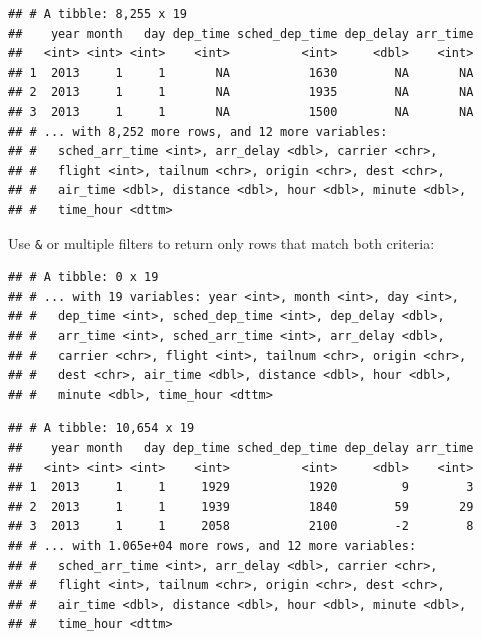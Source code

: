 \documentclass[]{book}
\newenvironment{Shaded}{}{}
\newcommand{\DecValTok}[1]{#1}
\newcommand{\KeywordTok}[1]{\textcolor[rgb]{0.00,0.00,1.00}{#1}}
\newcommand{\NormalTok}[1]{#1}
\newcommand{\OperatorTok}[1]{#1}
\newcommand{\StringTok}[1]{\textcolor[rgb]{0.00,0.50,0.50}{#1}}
\begin{document}
\begin{verbatim}
## # A tibble: 8,255 x 19
##    year month   day dep_time sched_dep_time dep_delay arr_time
##   <int> <int> <int>    <int>          <int>     <dbl>    <int>
## 1  2013     1     1       NA           1630        NA       NA
## 2  2013     1     1       NA           1935        NA       NA
## 3  2013     1     1       NA           1500        NA       NA
## # ... with 8,252 more rows, and 12 more variables:
## #   sched_arr_time <int>, arr_delay <dbl>, carrier <chr>,
## #   flight <int>, tailnum <chr>, origin <chr>, dest <chr>,
## #   air_time <dbl>, distance <dbl>, hour <dbl>, minute <dbl>,
## #   time_hour <dttm>
\end{verbatim}

Use \texttt{\&} or multiple filters to return only rows that match both criteria:

\begin{Shaded}
\end{Shaded}

\begin{verbatim}
## # A tibble: 0 x 19
## # ... with 19 variables: year <int>, month <int>, day <int>,
## #   dep_time <int>, sched_dep_time <int>, dep_delay <dbl>,
## #   arr_time <int>, sched_arr_time <int>, arr_delay <dbl>,
## #   carrier <chr>, flight <int>, tailnum <chr>, origin <chr>,
## #   dest <chr>, air_time <dbl>, distance <dbl>, hour <dbl>,
## #   minute <dbl>, time_hour <dttm>
\end{verbatim}

\begin{Shaded}
\end{Shaded}

\begin{verbatim}
## # A tibble: 10,654 x 19
##    year month   day dep_time sched_dep_time dep_delay arr_time
##   <int> <int> <int>    <int>          <int>     <dbl>    <int>
## 1  2013     1     1     1929           1920         9        3
## 2  2013     1     1     1939           1840        59       29
## 3  2013     1     1     2058           2100        -2        8
## # ... with 1.065e+04 more rows, and 12 more variables:
## #   sched_arr_time <int>, arr_delay <dbl>, carrier <chr>,
## #   flight <int>, tailnum <chr>, origin <chr>, dest <chr>,
## #   air_time <dbl>, distance <dbl>, hour <dbl>, minute <dbl>,
## #   time_hour <dttm>
\end{verbatim}
\end{document}
